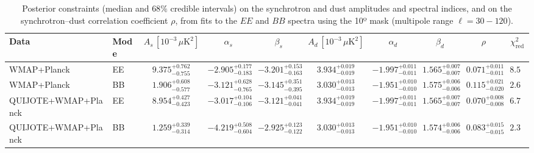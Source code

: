 \begin{table}[h]
\centering
\scriptsize
\setlength{\tabcolsep}{4pt}
\caption{Posterior constraints (median and $68\%$ credible intervals) on the synchrotron and dust amplitudes and spectral indices, and on the synchrotron--dust correlation coefficient $\rho$, from fits to the $EE$ and $BB$ spectra using the 10º mask (multipole range $\ell=30-120$).}
\label{tab:fit_results}
\begin{tabular}{llcccccccc}
\toprule
Data & Mode & $A_s\,[10^{-3}\,\mu\mathrm{K}^2]$ & $\alpha_s$ & $\beta_s$ & $A_d\,[10^{-3}\,\mu\mathrm{K}^2]$ & $\alpha_d$ & $\beta_d$ & $\rho$ & $\chi^2_\mathrm{red}$ \\
\midrule
WMAP+Planck & EE & $9.375^{+0.762}_{-0.755}$ & $-2.905^{+0.177}_{-0.183}$ & $-3.201^{+0.153}_{-0.163}$ & $3.934^{+0.019}_{-0.019}$ & $-1.997^{+0.011}_{-0.011}$ & $1.565^{+0.007}_{-0.007}$ & $0.071^{+0.011}_{-0.011}$ & $8.50$ \\
WMAP+Planck & BB & $1.906^{+0.608}_{-0.577}$ & $-3.121^{+0.628}_{-0.765}$ & $-3.145^{+0.351}_{-0.395}$ & $3.030^{+0.013}_{-0.013}$ & $-1.951^{+0.010}_{-0.010}$ & $1.575^{+0.006}_{-0.006}$ & $0.115^{+0.021}_{-0.020}$ & $2.63$ \\
QUIJOTE+WMAP+Planck & EE & $8.954^{+0.427}_{-0.423}$ & $-3.017^{+0.104}_{-0.106}$ & $-3.121^{+0.041}_{-0.041}$ & $3.934^{+0.019}_{-0.019}$ & $-1.997^{+0.011}_{-0.011}$ & $1.565^{+0.007}_{-0.007}$ & $0.070^{+0.008}_{-0.008}$ & $6.76$ \\
QUIJOTE+WMAP+Planck & BB & $1.259^{+0.339}_{-0.314}$ & $-4.219^{+0.508}_{-0.604}$ & $-2.925^{+0.123}_{-0.122}$ & $3.030^{+0.013}_{-0.013}$ & $-1.951^{+0.010}_{-0.010}$ & $1.574^{+0.006}_{-0.006}$ & $0.083^{+0.015}_{-0.015}$ & $2.31$ \\
\bottomrule
\end{tabular}
\end{table}